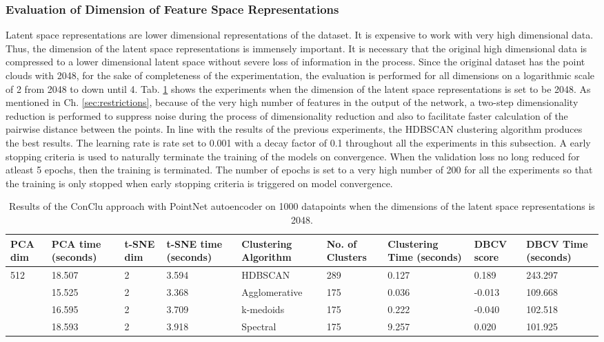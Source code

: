 \subsubsection{Evaluation of Dimension of Feature Space Representations}
Latent space representations are lower dimensional representations of the dataset. It is expensive to work with very high dimensional data. Thus, the dimension of the latent space representations is immensely important. It is necessary that the original high dimensional data is compressed to a lower dimensional latent space without severe loss of information in the process. Since the original dataset has the point clouds with 2048, for the sake of completeness of the experimentation, the evaluation is performed for all dimensions on a logarithmic scale of 2 from 2048 to down until 4. Tab. \ref{tab:conclu_2048} shows the experiments when the dimension of the latent space representations is set to be 2048. As mentioned in Ch. \ref{sec:restrictions}, because of the very high number of features in the output of the network, a two-step dimensionality reduction is performed to suppress noise during the process of dimensionality reduction and also to facilitate faster calculation of the pairwise distance between the points. In line with the results of the previous experiments, the \ac{HDBSCAN} clustering algorithm produces the best results. The learning rate is rate set to 0.001 with a decay factor of 0.1 throughout all the experiments in this subsection. A early stopping criteria is used to naturally terminate the training of the models on convergence. When the validation loss no long reduced for atleast 5 epochs, then the training is terminated. The number of epochs is set to a very high number of 200 for all the experiments so that the training is only stopped when early stopping criteria is triggered on model convergence. 
\begin{table}[H]
    \setlength\extrarowheight{10pt}
    \caption{Results of the ConClu approach with PointNet autoencoder on 1000 datapoints when the dimensions of the latent space representations is 2048. }
    \centering
    \begin{tabular}{|p{30pt}|p{30pt}|p{30pt}|p{30pt}|p{60pt}|p{30pt}|p{40pt}|p{30pt}|p{30pt}|}
      \toprule
      \ac{PCA} dim & \ac{PCA} time (seconds)& \ac{t-SNE} dim	& \ac{t-SNE} time (seconds) & Clustering Algorithm & No. of Clusters & Clustering Time (seconds) & \ac{DBCV} score & \ac{DBCV} Time (seconds)\\
      \midrule
      \multirow{4}{30pt}{512}	& 18.507 & 2	& 3.594 & \ac{HDBSCAN}	& 289	& 0.127 & 0.189 & 243.297 \\ \cline{2-9} 
      & 15.525 & 2	& 3.368 & Agglomerative	& 175	& 0.036	& -0.013	& 109.668 \\ \cline{2-9} 
      & 16.595 & 2	& 3.709 & k-medoids & 175	& 0.222 & -0.040	& 102.518 \\ \cline{2-9}
      & 18.593 & 2	& 3.918 & Spectral	& 175	& 9.257 & 0.020	& 101.925 \\ 
      \bottomrule
    \end{tabular}
    \label{tab:conclu_2048}
\end{table}

